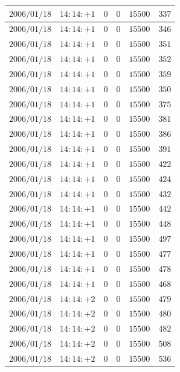 \documentclass[a4j,papersize,disablejfam,slide,14pt]{jsarticle}
\begin{document}
\begin{description}
\begin{center}
\begin{longtable}{|l|l|l|l|l|l|}
					$2006/01/18$ & $14:14:+1$  & $0$ & $0$ & $15500$ & $337$ \\ \hline
					$2006/01/18$ & $14:14:+1$  & $0$ & $0$ & $15500$ & $346$ \\ \hline
					$2006/01/18$ & $14:14:+1$  & $0$ & $0$ & $15500$ & $351$ \\ \hline
					$2006/01/18$ & $14:14:+1$  & $0$ & $0$ & $15500$ & $352$ \\ \hline
					$2006/01/18$ & $14:14:+1$  & $0$ & $0$ & $15500$ & $359$ \\ \hline
					$2006/01/18$ & $14:14:+1$  & $0$ & $0$ & $15500$ & $350$ \\ \hline
					$2006/01/18$ & $14:14:+1$  & $0$ & $0$ & $15500$ & $375$ \\ \hline
					$2006/01/18$ & $14:14:+1$  & $0$ & $0$ & $15500$ & $381$ \\ \hline
					$2006/01/18$ & $14:14:+1$  & $0$ & $0$ & $15500$ & $386$ \\ \hline
					$2006/01/18$ & $14:14:+1$  & $0$ & $0$ & $15500$ & $391$ \\ \hline
					$2006/01/18$ & $14:14:+1$  & $0$ & $0$ & $15500$ & $422$ \\ \hline
					$2006/01/18$ & $14:14:+1$  & $0$ & $0$ & $15500$ & $424$ \\ \hline
					$2006/01/18$ & $14:14:+1$  & $0$ & $0$ & $15500$ & $432$ \\ \hline
					$2006/01/18$ & $14:14:+1$  & $0$ & $0$ & $15500$ & $442$ \\ \hline
					$2006/01/18$ & $14:14:+1$  & $0$ & $0$ & $15500$ & $448$ \\ \hline
					$2006/01/18$ & $14:14:+1$  & $0$ & $0$ & $15500$ & $497$ \\ \hline
					$2006/01/18$ & $14:14:+1$  & $0$ & $0$ & $15500$ & $477$ \\ \hline
					$2006/01/18$ & $14:14:+1$  & $0$ & $0$ & $15500$ & $478$ \\ \hline
					$2006/01/18$ & $14:14:+1$  & $0$ & $0$ & $15500$ & $468$ \\ \hline
					$2006/01/18$ & $14:14:+2$  & $0$ & $0$ & $15500$ & $479$ \\ \hline
					$2006/01/18$ & $14:14:+2$  & $0$ & $0$ & $15500$ & $480$ \\ \hline
					$2006/01/18$ & $14:14:+2$  & $0$ & $0$ & $15500$ & $482$ \\ \hline
					$2006/01/18$ & $14:14:+2$  & $0$ & $0$ & $15500$ & $508$ \\ \hline
					$2006/01/18$ & $14:14:+2$  & $0$ & $0$ & $15500$ & $536$ \\ \hline

\end{longtable}
\end{center}
\end{description}
\end{document}
